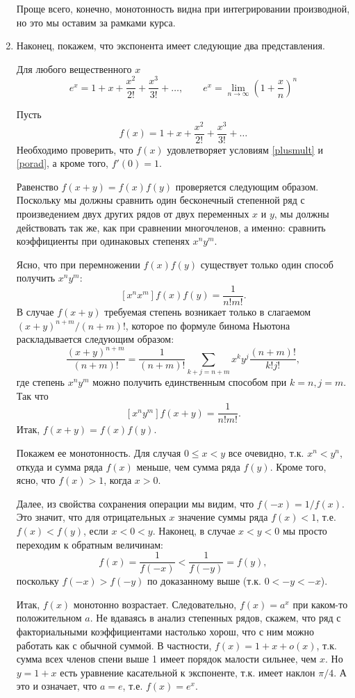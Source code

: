\begin{enumerate}
Проще всего, конечно, монотонность видна при интегрировании производной, но это мы оставим за рамками курса.





\item Наконец, покажем, что экспонента имеет следующие два представления.
\begin{thrm}\label{exp-series-lim} Для любого вещественного $x$
$$
e^x = 1+x+\frac{x^2}{2!}+\frac{x^3}{3!}+\dots,\qquad e^x=\lim_{n\to\infty}\left(1+\frac xn\right)^n
$$
\end{thrm}
\pf
Пусть
$$
f(x) = 1+x+\frac{x^2}{2!}+\frac{x^3}{3!}+\dots
$$
Необходимо проверить, что $f(x)$ удовлетворяет условиям \eqref{plusmult} и \eqref{porad}, а кроме того, $f'(0)=1$.

Равенство $f(x+y)=f(x)f(y)$ проверяется следующим образом. Поскольку мы должны сравнить один бесконечный степенной ряд с произведением двух других рядов от двух переменных $x$ и $y$, мы должны действовать так же, как при сравнении многочленов, а именно: сравнить коэффициенты при одинаковых степенях $x^ny^m$.

Ясно, что при перемножении $f(x)f(y)$ существует только один способ получить $x^ny^m$:
$$
[x^nx^m]f(x)f(y) = \frac{1}{n!m!}.
$$
В случае $f(x+y)$ требуемая степень возникает только в слагаемом $(x+y)^{n+m}/(n+m)!$, которое по формуле бинома Ньютона раскладывается следующим образом:
$$
\frac{(x+y)^{n+m}}{(n+m)!} = \frac{1}{(n+m)!}\sum_{k+j=n+m}x^ky^j\frac{(n+m)!}{k!j!},
$$
где степень $x^ny^m$ можно получить единственным способом при $k=n, j=m$. Так что
$$
[x^ny^m]f(x+y) = \frac{1}{n!m!}.
$$
Итак, $f(x+y)=f(x)f(y)$.

Покажем ее монотонность. Для случая $0\le x<y$ все очевидно, т.к. $x^n<y^n$, откуда и сумма ряда $f(x)$ меньше, чем сумма ряда $f(y)$. Кроме того, ясно, что $f(x)>1$, когда $x>0$.

Далее, из свойства сохранения операции мы видим, что $f(-x)=1/f(x)$. Это значит, что для отрицательных $x$ значение суммы ряда $f(x)<1$, т.е. $f(x)<f(y)$, если $x<0<y$. Наконец, в случае $x<y<0$ мы просто переходим к обратным величинам:
$$
f(x)=\frac{1}{f(-x)}<\frac{1}{f(-y)}=f(y),
$$
поскольку $f(-x)>f(-y)$ по доказанному выше (т.к. $0<-y<-x$).

Итак, $f(x)$ монотонно возрастает. Следовательно, $f(x)=a^x$ при каком-то положительном $a$. Не вдаваясь в анализ степенных рядов, скажем, что ряд с факториальными коэффициентами настолько хорош, что с ним можно работать как с обычной суммой. В частности, $f(x)=1+x+o(x)$, т.к. сумма всех членов спени выше 1 имеет порядок малости сильнее, чем $x$. Но $y=1+x$ есть уравнение касательной к экспоненте, т.к. имеет наклон $\pi/4$. А это и означает, что $a=e$, т.е. $f(x)=e^x$.


\end{enumerate}
